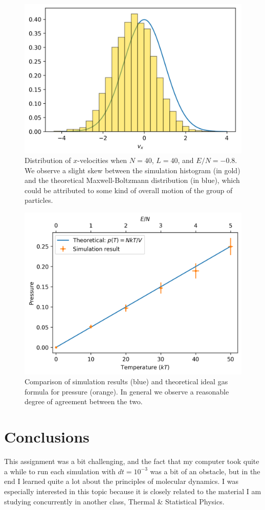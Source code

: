 \documentclass{article}
\begin{document}
\begin{figure}[H]
    \centering
    \includegraphics[width=5in]{homework8/p3b.png}
    \caption{Distribution of $x$-velocities when $N=40$, $L=40$, and $E/N=-0.8$. We observe a slight skew between the simulation histogram (in gold) and the theoretical Maxwell-Boltzmann distribution (in blue), which could be attributed to some kind of overall motion of the group of particles.}
    \label{fig:3b}
\end{figure}

\bigskip
{}
\medskip

\begin{figure}[H]
    \centering
    \includegraphics[width=5in]{homework8/p4.png}
    \caption{Comparison of simulation results (blue) and theoretical ideal gas formula for pressure (orange). In general we observe a reasonable degree of agreement between the two.}
    \label{fig:4}
\end{figure}

\section{Conclusions}

This assignment was a bit challenging, and the fact that my computer took quite a while to run each simulation with $dt=10^{-3}$ was a bit of an obstacle, but in the end I learned quite a lot about the principles of molecular dynamics. I was especially interested in this topic because it is closely related to the material I am studying concurrently in another class, Thermal \& Statistical Physics.
\end{document}

